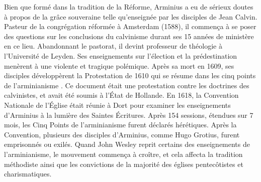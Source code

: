 Bien que formé dans la tradition de la Réforme, Arminius a eu de sérieux doutes
 à propos de \og la grâce souveraine \fg{}  telle qu'enseignée
 par les disciples de Jean Calvin. Pasteur de la congrégation réformée à Amsterdam (1588),
 il commença à se poser des questions sur les conclusions du calvinisme
 durant ses 15 années de ministère en ce lieu. Abandonnant le pastorat,
 il devint professeur de théologie à l'Université de Leyden.
 Ses enseignements sur l'élection et la prédestination menèrent à une violente
 et tragique polémique. Après sa mort en 1609, ses disciples développèrent la Protestation
 de 1610 qui se résume dans les \og cinq points de l'arminianisme \fg{}.
 Ce document était une protestation contre les doctrines des calvinistes,
 et avait été soumis à l'État de Hollande. En 1618, la Convention Nationale
 de l'Église était réunie à Dort pour examiner les enseignements d'Arminius
 à la lumière des Saintes Écritures. Après 154 sessions, étendues sur 7 mois,
 les Cinq Points de l'arminianisme furent déclarés hérétiques.
 Après la Convention, plusieurs des disciples d'Arminius, comme Hugo Grotius,
 furent emprisonnés ou exilés. Quand John Wesley reprit certains des enseignements
 de l'arminianisme, le mouvement  commença à croître, et cela affecta la tradition méthodiste
 ainsi que les convictions de la majorité des églises pentecôtistes et charismatiques.

